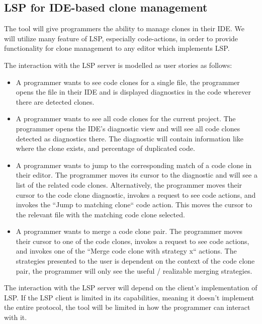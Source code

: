 \documentclass[12pt]{article}
\begin{document}
\subsection{LSP for IDE-based clone management}

The tool will give programmers the ability to manage clones in their IDE. We will utilize
many feature of LSP, especially code-actions, in order to provide functionality for clone
management to any editor which implements LSP.

The interaction with the LSP server is modelled as user stories as follows:

\begin{itemize}
	\item A programmer wants to see code clones for a single file, the
	      programmer opens the file in their IDE and is displayed diagnostics in the code
	      wherever there are detected clones.

	\item A programmer wants to see all code clones for the current project. The
	      programmer opens the IDE's diagnostic view and will see all code clones detected
	      as diagnostics there. The diagnostic will contain information like where the clone
	      exists, and percentage of duplicated code.

	\item A programmer wants to jump to the corresponding match of a code clone in their
	      editor. The programmer moves its cursor to the diagnostic and will see a list of
	      the related code clones. Alternatively, the programmer moves their cursor to the
	      code clone diagnostic, invokes a request to see code actions, and invokes the
	      ``Jump to matching clone`` code action. This moves the cursor to the relevant file
	      with the matching code clone selected.

	\item A programmer wants to merge a code clone pair. The programmer moves their cursor
	      to one of the code clones, invokes a request to see code actions, and invokes one
	      of the ``Merge code clone with strategy x`` actions. The strategies presented to
	      the user is dependent on the context of the code clone pair, the programmer will
	      only see the useful / realizable merging strategies.
\end{itemize}

The interaction with the LSP server will depend on the client's implementation of LSP. If
the LSP client is limited in its capabilities, meaning it doesn't implement the entire
protocol, the tool will be limited in how the programmer can interact with it.
\end{document}
